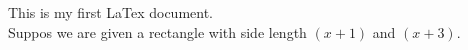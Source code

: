 \documentclass[12pt]{article}
\begin{document}
This is my first LaTex document.\\
Suppos we are given a rectangle with side length $ (x+1) $ and $(x+3)$.
\end{document}
